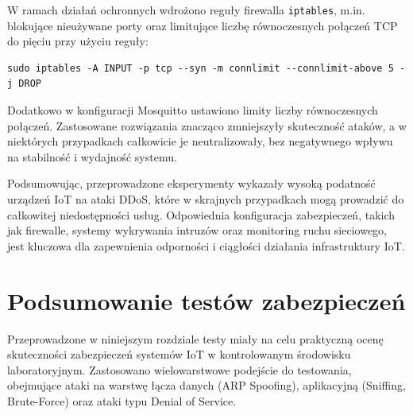 \medskip
W ramach działań ochronnych wdrożono reguły firewalla \texttt{iptables}, m.in. blokujące nieużywane porty oraz limitujące liczbę równoczesnych połączeń TCP do pięciu przy użyciu reguły:
\begin{verbatim}
sudo iptables -A INPUT -p tcp --syn -m connlimit --connlimit-above 5 -j DROP
\end{verbatim}
Dodatkowo w konfiguracji Mosquitto ustawiono limity liczby równoczesnych połączeń. Zastosowane rozwiązania znacząco zmniejszyły skuteczność ataków, a w niektórych przypadkach całkowicie je neutralizowały, bez negatywnego wpływu na stabilność i wydajność systemu.

\medskip
Podsumowując, przeprowadzone eksperymenty wykazały wysoką podatność urządzeń IoT na ataki DDoS, które w skrajnych przypadkach mogą prowadzić do całkowitej niedostępności usług. Odpowiednia konfiguracja zabezpieczeń, takich jak firewalle, systemy wykrywania intruzów oraz monitoring ruchu sieciowego, jest kluczowa dla zapewnienia odporności i ciągłości działania infrastruktury IoT.

\section{Podsumowanie testów zabezpieczeń}
Przeprowadzone w niniejszym rozdziale testy miały na celu praktyczną ocenę skuteczności zabezpieczeń systemów IoT w kontrolowanym środowisku laboratoryjnym. Zastosowano wielowarstwowe podejście do testowania, obejmujące ataki na warstwę łącza danych (ARP Spoofing), aplikacyjną (Sniffing, Brute-Force) oraz ataki typu Denial of Service.

